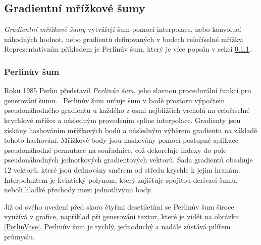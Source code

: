 \subsection{Gradientní mřížkové šumy}
\label{LatticeNoises}
\textit{Gradientní mřížkové šumy} vytvářejí šum pomocí interpolace, nebo konvolucí náhodných hodnot, nebo gradientů definovaných v bodech celočíselné mřížky. Reprezentativním příkladem je Perlinův šum, který je více popsán v sekci \ref{perlinNoise}. \cite{Lagae10}

\subsubsection{Perlinův šum}
\label{perlinNoise}
Roku 1985 Perlin představil \textit{Perlinův šum}, jeho slavnou procedurální funkci pro generování šumu.~\cite{PerlinKen, Perlin2002} Perlinův šum určuje šum v bodě prostoru výpočtem pseudonáhodného gradientu u každého z osmi nejbližších vrcholů na celočíselné krychlové mřížce a následným provedením spline interpolace. Gradienty jsou získány hashováním mřížkových bodů a následným výběrem gradientu na základě tohoto hashování. Mřížkové body jsou hashovány pomocí postupné aplikace pseudonáhodné permutace na souřadnice, což dekoreluje indexy do pole pseudonáhodných jednotkových gradientových vektorů. Sada gradientů obsahuje 12 vektorů, které jsou definovány směrem od středu krychle k jejím hranám. Interpolantem je kvintický polynom, který zajišťuje spojitou derivaci šumu, neboli hladké přechody mezi jednotlivými body.

Již od svého uvedení před skoro čtyřmi desetiletími se Perlinův šum široce využívá v grafice, například při generování textur, které je vidět na obrázku \ref{PerlinVase}. Perlinův šum je rychlý, jednoduchý a nadále zůstává pilířem průmyslu.

